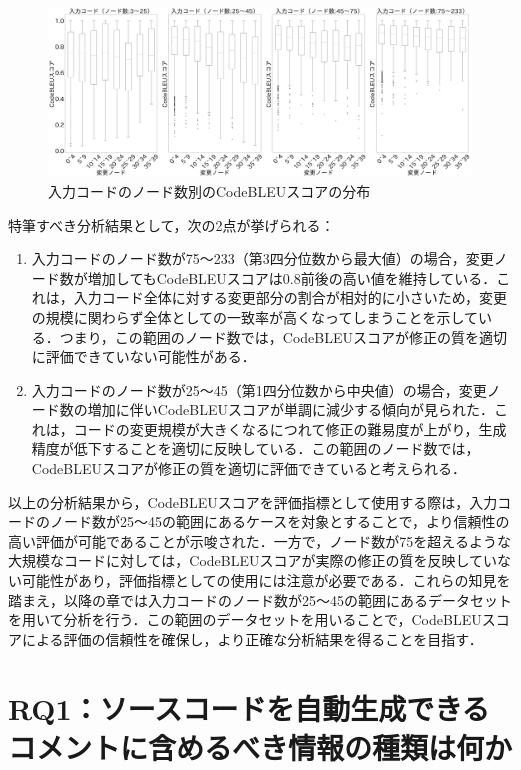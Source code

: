\documentclass[11pt]{jreport}
\newcommand{\RQone}{ソースコードを自動生成できるコメントに含めるべき情報の種類は何か}
\begin{document}
\begin{figure}[h]
   \centering
   \includegraphics[width=1.0\linewidth]{@BSthesis2024_Akamatsu/Akamatsu_figs/nodescores.pdf}
   \caption{入力コードのノード数別のCodeBLEUスコアの分布}
   \label{fig:node-scores}
\end{figure}

特筆すべき分析結果として，次の2点が挙げられる：

\begin{enumerate}
   \item 入力コードのノード数が75〜233（第3四分位数から最大値）の場合，変更ノード数が増加してもCodeBLEUスコアは0.8前後の高い値を維持している．これは，入力コード全体に対する変更部分の割合が相対的に小さいため，変更の規模に関わらず全体としての一致率が高くなってしまうことを示している．つまり，この範囲のノード数では，CodeBLEUスコアが修正の質を適切に評価できていない可能性がある．
   
   \item 入力コードのノード数が25〜45（第1四分位数から中央値）の場合，変更ノード数の増加に伴いCodeBLEUスコアが単調に減少する傾向が見られた．これは，コードの変更規模が大きくなるにつれて修正の難易度が上がり，生成精度が低下することを適切に反映している．この範囲のノード数では，CodeBLEUスコアが修正の質を適切に評価できていると考えられる．
\end{enumerate}

以上の分析結果から，CodeBLEUスコアを評価指標として使用する際は，入力コードのノード数が25〜45の範囲にあるケースを対象とすることで，より信頼性の高い評価が可能であることが示唆された．一方で，ノード数が75を超えるような大規模なコードに対しては，CodeBLEUスコアが実際の修正の質を反映していない可能性があり，評価指標としての使用には注意が必要である．これらの知見を踏まえ，以降の章では入力コードのノード数が25〜45の範囲にあるデータセットを用いて分析を行う．この範囲のデータセットを用いることで，CodeBLEUスコアによる評価の信頼性を確保し，より正確な分析結果を得ることを目指す．


\chapter{RQ1：\RQone}\label{chap:fig-tab-exp}
\end{document}
